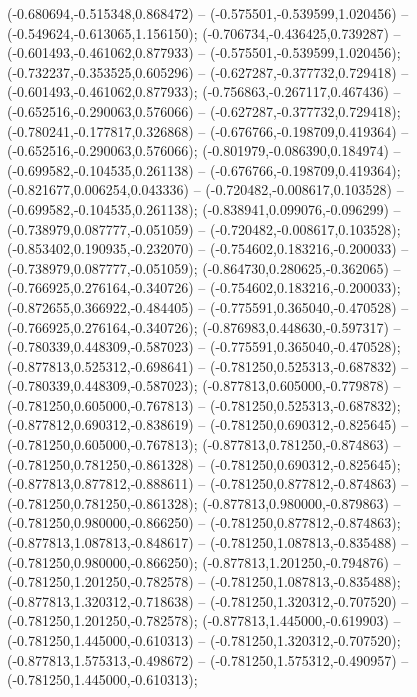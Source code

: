  (-0.680694,-0.515348,0.868472) -- (-0.575501,-0.539599,1.020456) -- (-0.549624,-0.613065,1.156150);
 (-0.706734,-0.436425,0.739287) -- (-0.601493,-0.461062,0.877933) -- (-0.575501,-0.539599,1.020456);
 (-0.732237,-0.353525,0.605296) -- (-0.627287,-0.377732,0.729418) -- (-0.601493,-0.461062,0.877933);
 (-0.756863,-0.267117,0.467436) -- (-0.652516,-0.290063,0.576066) -- (-0.627287,-0.377732,0.729418);
 (-0.780241,-0.177817,0.326868) -- (-0.676766,-0.198709,0.419364) -- (-0.652516,-0.290063,0.576066);
 (-0.801979,-0.086390,0.184974) -- (-0.699582,-0.104535,0.261138) -- (-0.676766,-0.198709,0.419364);
 (-0.821677,0.006254,0.043336) -- (-0.720482,-0.008617,0.103528) -- (-0.699582,-0.104535,0.261138);
 (-0.838941,0.099076,-0.096299) -- (-0.738979,0.087777,-0.051059) -- (-0.720482,-0.008617,0.103528);
 (-0.853402,0.190935,-0.232070) -- (-0.754602,0.183216,-0.200033) -- (-0.738979,0.087777,-0.051059);
 (-0.864730,0.280625,-0.362065) -- (-0.766925,0.276164,-0.340726) -- (-0.754602,0.183216,-0.200033);
 (-0.872655,0.366922,-0.484405) -- (-0.775591,0.365040,-0.470528) -- (-0.766925,0.276164,-0.340726);
 (-0.876983,0.448630,-0.597317) -- (-0.780339,0.448309,-0.587023) -- (-0.775591,0.365040,-0.470528);
 (-0.877813,0.525312,-0.698641) -- (-0.781250,0.525313,-0.687832) -- (-0.780339,0.448309,-0.587023);
 (-0.877813,0.605000,-0.779878) -- (-0.781250,0.605000,-0.767813) -- (-0.781250,0.525313,-0.687832);
 (-0.877812,0.690312,-0.838619) -- (-0.781250,0.690312,-0.825645) -- (-0.781250,0.605000,-0.767813);
 (-0.877813,0.781250,-0.874863) -- (-0.781250,0.781250,-0.861328) -- (-0.781250,0.690312,-0.825645);
 (-0.877813,0.877812,-0.888611) -- (-0.781250,0.877812,-0.874863) -- (-0.781250,0.781250,-0.861328);
 (-0.877813,0.980000,-0.879863) -- (-0.781250,0.980000,-0.866250) -- (-0.781250,0.877812,-0.874863);
 (-0.877813,1.087813,-0.848617) -- (-0.781250,1.087813,-0.835488) -- (-0.781250,0.980000,-0.866250);
 (-0.877813,1.201250,-0.794876) -- (-0.781250,1.201250,-0.782578) -- (-0.781250,1.087813,-0.835488);
 (-0.877813,1.320312,-0.718638) -- (-0.781250,1.320312,-0.707520) -- (-0.781250,1.201250,-0.782578);
 (-0.877813,1.445000,-0.619903) -- (-0.781250,1.445000,-0.610313) -- (-0.781250,1.320312,-0.707520);
 (-0.877813,1.575313,-0.498672) -- (-0.781250,1.575312,-0.490957) -- (-0.781250,1.445000,-0.610313);
